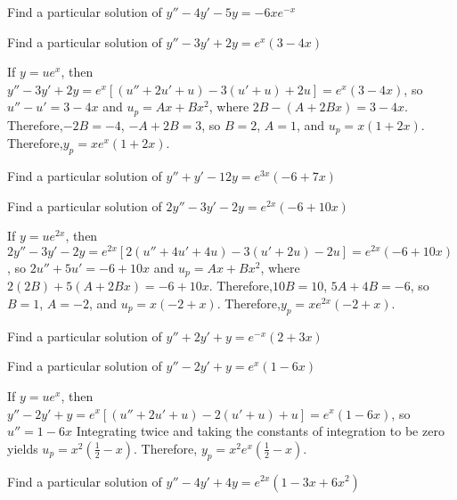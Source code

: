 \documentclass{ximera}
\begin{document}
\begin{problem}\label{exer:5.4.7} Find a particular
solution of $y''-4y'-5y=-6xe^{-x}$
\end{problem}

\begin{problem}\label{exer:5.4.8} Find a particular
solution of $y''-3y'+2y=e^x(3-4x)$
\begin{solution}
If $y=ue^x$, then $y''-3y'+2y=e^x\left[(u''+2u'+u)-3(u'+u)+2u\right]=
e^x(3-4x)$, so $u''-u'=3-4x$ and $u_p=Ax+Bx^2$, where
$2B-(A+2Bx)=3-4x$. Therefore,$-2B=-4$, $-A+2B=3$, so $B=2$, $A=1$, and
$u_p=x(1+2x)$. Therefore,$y_p=xe^x(1+2x)$.
\end{solution}
\end{problem}

\begin{problem}\label{exer:5.4.9} Find a particular
solution of $y''+y'-12y=e^{3x}(-6+7x)$
\end{problem}

\begin{problem}\label{exer:5.4.10} Find a particular
solution of $2y''-3y'-2y=e^{2x}(-6+10x)$
\begin{solution}
If $y=ue^{2x}$, then
$2y''-3y'-2y=e^{2x}\left[2(u''+4u'+4u)-3(u'+2u)-2u\right]=
e^{2x}(-6+10x)$, so $2u''+5u'=-6+10x$ and $u_p=Ax+Bx^2$, where
$2(2B)+5(A+2Bx)=-6+10x$. Therefore,$10B=10$, $5A+4B=-6$, so $B=1$,
$A=-2$, and $u_p=x(-2+x)$. Therefore,$y_p=xe^{2x}(-2+x)$.
\end{solution}
\end{problem}

\begin{problem}\label{exer:5.4.11} Find a particular
solution of $y''+2y'+y=e^{-x}(2+3x)$ 
\end{problem}

\begin{problem}\label{exer:5.4.12} Find a particular
solution of $y''-2y'+y=e^x(1-6x)$
\begin{solution}
If $y=ue^x$, then $y''-2y'+y=e^x\left[(u''+2u'+u)-2(u'+u)+u\right]=
e^x(1-6x)$, so $u''=1-6x$ Integrating twice and taking the constants
of integration to be zero yields
$u_p=x^2\left(\frac{1}{2}-x\right)$. Therefore,
$y_p=x^2e^x\left(\frac{1}{2}-x\right)$.
\end{solution}
\end{problem}

\begin{problem}\label{exer:5.4.13} Find a particular
solution of $y''-4y'+4y=e^{2x}(1-3x+6x^2)$
\end{problem}
\end{document}
